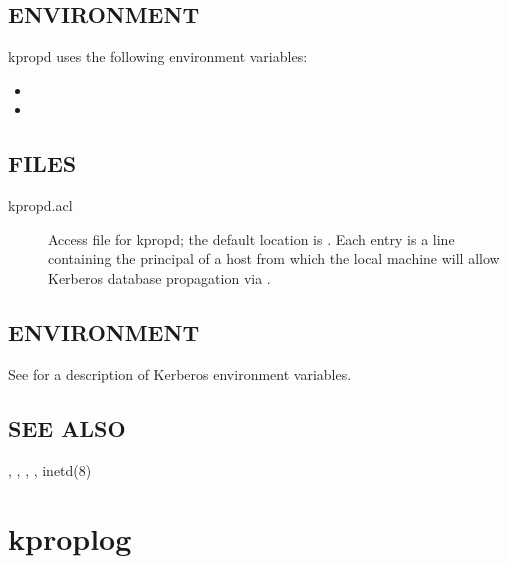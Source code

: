 \documentclass[letterpaper,10pt,english]{sphinxmanual}
\begin{document}
\subsection{ENVIRONMENT}
\label{\detokenize{admin/admin_commands/kpropd:environment}}
kpropd uses the following environment variables:
\begin{itemize}
\item {} 

\item {} 

\end{itemize}


\subsection{FILES}
\label{\detokenize{admin/admin_commands/kpropd:files}}\begin{description}
\item[{kpropd.acl}] \leavevmode
Access file for kpropd; the default location is
.  Each entry is a line
containing the principal of a host from which the local machine
will allow Kerberos database propagation via {\hyperref[\detokenize{admin/admin_commands/kprop:kprop-8}]{}}.

\end{description}


\subsection{ENVIRONMENT}
\label{\detokenize{admin/admin_commands/kpropd:id1}}
See  for a description of Kerberos environment
variables.


\subsection{SEE ALSO}
\label{\detokenize{admin/admin_commands/kpropd:see-also}}
{\hyperref[\detokenize{admin/admin_commands/kprop:kprop-8}]{}}, {\hyperref[\detokenize{admin/admin_commands/kdb5_util:kdb5-util-8}]{}}, {\hyperref[\detokenize{admin/admin_commands/krb5kdc:krb5kdc-8}]{}},
, inetd(8)


\section{kproplog}
\label{\detokenize{admin/admin_commands/kproplog:kproplog}}\label{\detokenize{admin/admin_commands/kproplog:kproplog-8}}\label{\detokenize{admin/admin_commands/kproplog::doc}}
\end{document}
